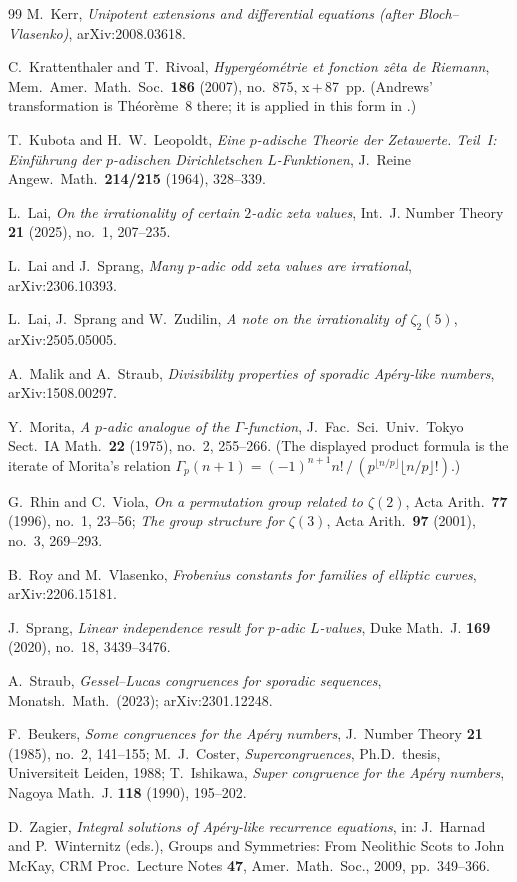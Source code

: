 \documentclass[11pt,reqno]{article}
\newcommand{\Gp}{\Gamma_p}
\newcommand{\floor}[1]{\lfloor #1 \rfloor}
\theoremstyle{plain}
\theoremstyle{definition}
\theoremstyle{remark}
\numberwithin{equation}{section}
\begin{document}
\begin{thebibliography}{99}
M.~Kerr,
\emph{Unipotent extensions and differential equations (after Bloch--Vlasenko)},
arXiv:2008.03618.

C.~Krattenthaler and T.~Rivoal,
\emph{Hyperg\'eom\'etrie et fonction z\^eta de Riemann},
Mem.\ Amer.\ Math.\ Soc.\ \textbf{186} (2007), no.~875, x\,+\,87~pp.
(Andrews' transformation is Th\'eor\`eme~8 there; it is applied in this form
in \cite{LSZ2025}.)

T.~Kubota and H.~W.~Leopoldt,
\emph{Eine $p$-adische Theorie der Zetawerte. Teil~I: Einf\"uhrung der
$p$-adischen Dirichletschen $L$-Funktionen},
J.\ Reine Angew.\ Math.\ \textbf{214/215} (1964), 328--339.

L.~Lai,
\emph{On the irrationality of certain $2$-adic zeta values},
Int.\ J. Number Theory \textbf{21} (2025), no.~1, 207--235.

L.~Lai and J.~Sprang,
\emph{Many $p$-adic odd zeta values are irrational},
arXiv:2306.10393.

L.~Lai, J.~Sprang and W.~Zudilin,
\emph{A note on the irrationality of $\zeta_2(5)$},
arXiv:2505.05005.

A.~Malik and A.~Straub,
\emph{Divisibility properties of sporadic Ap\'ery-like numbers},
arXiv:1508.00297.

Y.~Morita,
\emph{A $p$-adic analogue of the $\Gamma$-function},
J.\ Fac.\ Sci.\ Univ.\ Tokyo Sect.\ IA Math.\ \textbf{22} (1975), no.~2,
255--266.
(The displayed product formula is the iterate of Morita's relation
$\Gp(n+1)=(-1)^{n+1}n!\,/\,(p^{\floor{n/p}}\floor{n/p}!)$.)

G.~Rhin and C.~Viola,
\emph{On a permutation group related to $\zeta(2)$},
Acta Arith.\ \textbf{77} (1996), no.~1, 23--56;
\emph{The group structure for $\zeta(3)$},
Acta Arith.\ \textbf{97} (2001), no.~3, 269--293.

B.~Roy and M.~Vlasenko,
\emph{Frobenius constants for families of elliptic curves},
arXiv:2206.15181.

J.~Sprang,
\emph{Linear independence result for $p$-adic $L$-values},
Duke Math.\ J. \textbf{169} (2020), no.~18, 3439--3476.

A.~Straub,
\emph{Gessel--Lucas congruences for sporadic sequences},
Monatsh.\ Math.\ (2023); arXiv:2301.12248.

F.~Beukers,
\emph{Some congruences for the Ap\'ery numbers},
J.\ Number Theory \textbf{21} (1985), no.~2, 141--155;
M.~J.~Coster,
\emph{Supercongruences},
Ph.D.\ thesis, Universiteit Leiden, 1988;
T.~Ishikawa,
\emph{Super congruence for the Ap\'ery numbers},
Nagoya Math.\ J. \textbf{118} (1990), 195--202.

D.~Zagier,
\emph{Integral solutions of Ap\'ery-like recurrence equations},
in: J.~Harnad and P.~Winternitz (eds.), Groups and Symmetries:
From Neolithic Scots to John McKay,
CRM Proc.\ Lecture Notes \textbf{47}, Amer.\ Math.\ Soc., 2009, pp.~349--366.

\end{thebibliography}
\end{document}
